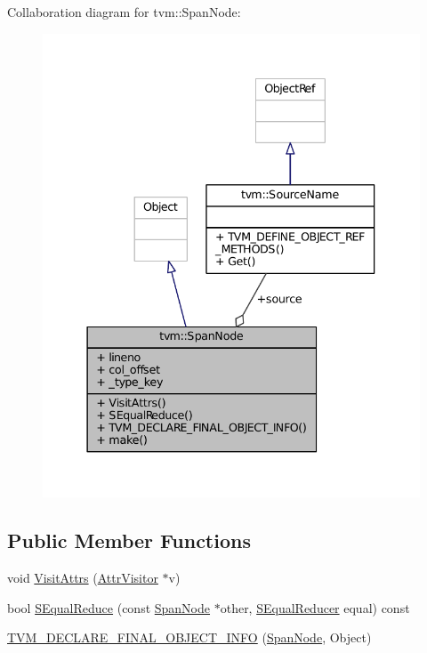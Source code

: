 Collaboration diagram for tvm\+:\+:Span\+Node\+:
\nopagebreak
\begin{figure}[H]
\begin{center}
\leavevmode
\includegraphics[width=337pt]{classtvm_1_1SpanNode__coll__graph}
\end{center}
\end{figure}
\subsection*{Public Member Functions}
\begin{DoxyCompactItemize}
\item 
void \hyperlink{classtvm_1_1SpanNode_adf555befd933b86f7ce2cfd0989d4282}{Visit\+Attrs} (\hyperlink{classtvm_1_1AttrVisitor}{Attr\+Visitor} $\ast$v)
\item 
bool \hyperlink{classtvm_1_1SpanNode_a303175c2e781ef104cd03e26010200b8}{S\+Equal\+Reduce} (const \hyperlink{classtvm_1_1SpanNode}{Span\+Node} $\ast$other, \hyperlink{classtvm_1_1SEqualReducer}{S\+Equal\+Reducer} equal) const 
\item 
\hyperlink{classtvm_1_1SpanNode_a18bcfd7f4d291e5973c510fddd53cb88}{T\+V\+M\+\_\+\+D\+E\+C\+L\+A\+R\+E\+\_\+\+F\+I\+N\+A\+L\+\_\+\+O\+B\+J\+E\+C\+T\+\_\+\+I\+N\+FO} (\hyperlink{classtvm_1_1SpanNode}{Span\+Node}, Object)
\end{DoxyCompactItemize}
